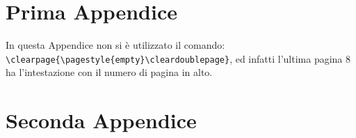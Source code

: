 \documentclass[12pt,a4paper,openright,twoside]{report}
\renewcommand{\chaptermark}[1]{\markboth{\thechapter.\ #1}{}}
\begin{document}
\clearpage{\pagestyle{empty}\cleardoublepage}



\renewcommand{\chaptermark}[1]{\markright{\thechapter \ #1}{}}
\lhead[\fancyplain{}{\bfseries\thepage}]{\fancyplain{}{\bfseries\rightmark}}
\appendix %
\chapter{Prima Appendice} %
In questa Appendice non si \`e utilizzato il comando:\\
\verb"\clearpage{\pagestyle{empty}\cleardoublepage}", ed infatti l'ultima pagina 8 ha l'intestazione con il numero di pagina in alto.



\clearpage{\pagestyle{empty}\cleardoublepage}



\chapter{Seconda Appendice}


\clearpage{\pagestyle{empty}\cleardoublepage}
\label{Bibliography}


\end{document}
